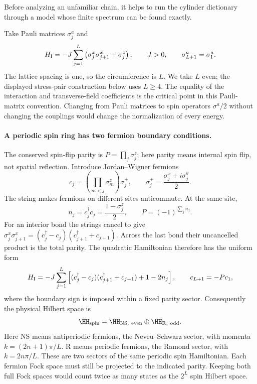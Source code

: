 Before analyzing an unfamiliar chain, it helps to run the cylinder
dictionary through a model whose finite spectrum can be found exactly.

\begin{example}
\label{ex:scaling-Ising-calibration}
Take Pauli matrices $\sigma_j^a$ and
\begin{equation}
 H_{\rm I}=-J\sum_{j=1}^L
       \left(\sigma_j^x\sigma_{j+1}^x+\sigma_j^z\right),
 \qquad J>0,\qquad \sigma_{L+1}^a=\sigma_1^a.
 \label{eq:scaling-Ising-H}
\end{equation}
The lattice spacing is one, so the circumference is $L$.
We take $L$ even; the displayed stress-pair construction below
uses $L\ge4$. The equality of the interaction and transverse-field
coefficients is the critical point in this Pauli-matrix convention.
Changing from Pauli matrices to spin operators $\sigma^a/2$ without
changing the couplings would change the normalization of every energy.

\paragraph{A periodic spin ring has two fermion boundary conditions.}

The conserved spin-flip parity is
$P=\prod_j\sigma_j^z$; here parity means internal spin flip,
not spatial reflection. Introduce Jordan--Wigner fermions
\[
 c_j=\left(\prod_{m<j}\sigma_m^z\right)\sigma_j^+,
 \qquad
 \sigma_j^+=\frac{\sigma_j^x+i\sigma_j^y}{2}.
\]
The string makes fermions on different sites anticommute.
At the same site,
\[
 n_j=c_j^\dagger c_j=\frac{1-\sigma_j^z}{2},
 \qquad P=(-1)^{\sum_jn_j}.
\]
For an interior bond the strings cancel to give
$\sigma_j^x\sigma_{j+1}^x
=(c_j^\dagger-c_j)(c_{j+1}^\dagger+c_{j+1})$.
Across the last bond their uncancelled product is the total
parity. The quadratic Hamiltonian therefore has the uniform form
\[
 H_{\rm I}=-J\sum_{j=1}^L
 \left[(c_j^\dagger-c_j)(c_{j+1}^\dagger+c_{j+1})
                  +1-2n_j\right],
 \qquad c_{L+1}=-P c_1,
\]
where the boundary sign is imposed within a fixed parity sector.
Consequently the physical Hilbert space is
\begin{equation}
 \HH_{\rm spin}
 =\HH_{\rm NS,\ even}\oplus\HH_{\rm R,\ odd}.
 \label{eq:scaling-Ising-parity}
\end{equation}
Here NS means antiperiodic fermions, the Neveu--Schwarz sector,
with momenta $k=(2n+1)\pi/L$. R means periodic fermions, the
Ramond sector, with $k=2n\pi/L$. These are two sectors of the
same periodic spin Hamiltonian. Each fermion Fock space must
still be projected to the indicated parity. Keeping both full
Fock spaces would count twice as many states as the $2^L$ spin
Hilbert space.


\end{example}
